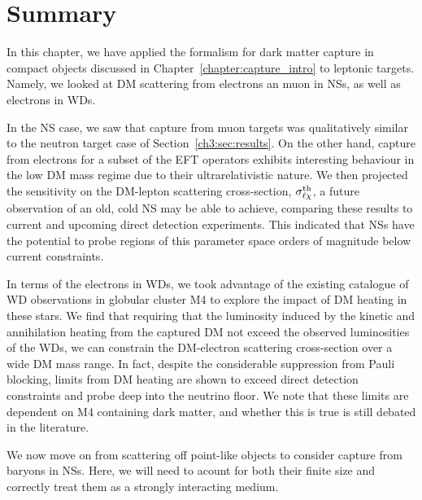 \section{Summary}
\label{ch4:sec:summary}

In this chapter, we have applied the formalism for dark matter capture in compact objects discussed in Chapter~\ref{chapter:capture_intro} to leptonic targets. Namely, we looked at DM scattering from electrons an muon in NSs, as well as electrons in WDs.

In the NS case, we saw that capture from muon targets was qualitatively similar to the neutron target case of Section~\ref{ch3:sec:results}. On the other hand, capture from electrons for a subset of the EFT operators exhibits interesting behaviour in the low DM mass regime due to their ultrarelativistic nature. We then projected the sensitivity on the DM-lepton scattering cross-section, $\sigma^{\rm th}_{\ell\chi}$, a future observation of an old, cold NS may be able to achieve, comparing these results to current and upcoming direct detection experiments. This indicated that NSs have the potential to probe regions of this parameter space orders of magnitude below current constraints. 

In terms of the electrons in WDs, we took advantage of the existing catalogue of WD observations in globular cluster M4 to explore the impact of DM heating in these stars. We find that requiring that the luminosity induced by the kinetic and annihilation heating from the captured DM not exceed the observed luminosities of the WDs, we can constrain the DM-electron scattering cross-section over a wide DM mass range. In fact, despite the considerable suppression from Pauli blocking, limits from DM heating are shown to exceed direct detection constraints and probe deep into the neutrino floor. 
We note that these limits are dependent on M4 containing dark matter, and whether this is true is still debated in the literature. 

We now move on from scattering off point-like objects to consider capture from baryons in NSs. Here, we will need to acount for both their finite size and correctly treat them as a strongly interacting medium. 